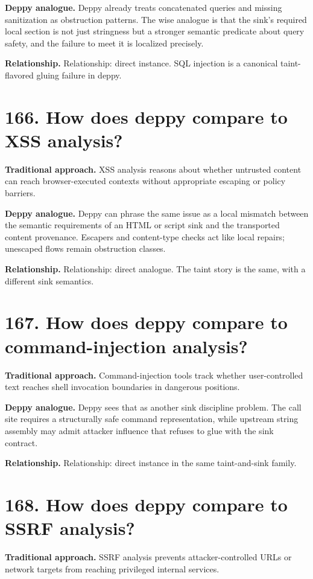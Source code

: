 \documentclass[11pt,openany]{book}
\begin{document}
\textbf{Deppy analogue.} Deppy already treats concatenated queries and missing sanitization as obstruction patterns. The wise analogue is that the sink's required local section is not just stringness but a stronger semantic predicate about query safety, and the failure to meet it is localized precisely.

\textbf{Relationship.} Relationship: direct instance. SQL injection is a canonical taint-flavored gluing failure in deppy.

\section*{166. How does deppy compare to XSS analysis?}
\textbf{Traditional approach.} XSS analysis reasons about whether untrusted content can reach browser-executed contexts without appropriate escaping or policy barriers.

\textbf{Deppy analogue.} Deppy can phrase the same issue as a local mismatch between the semantic requirements of an HTML or script sink and the transported content provenance. Escapers and content-type checks act like local repairs; unescaped flows remain obstruction classes.

\textbf{Relationship.} Relationship: direct analogue. The taint story is the same, with a different sink semantics.

\section*{167. How does deppy compare to command-injection analysis?}
\textbf{Traditional approach.} Command-injection tools track whether user-controlled text reaches shell invocation boundaries in dangerous positions.

\textbf{Deppy analogue.} Deppy sees that as another sink discipline problem. The call site requires a structurally safe command representation, while upstream string assembly may admit attacker influence that refuses to glue with the sink contract.

\textbf{Relationship.} Relationship: direct instance in the same taint-and-sink family.

\section*{168. How does deppy compare to SSRF analysis?}
\textbf{Traditional approach.} SSRF analysis prevents attacker-controlled URLs or network targets from reaching privileged internal services.
\end{document}
